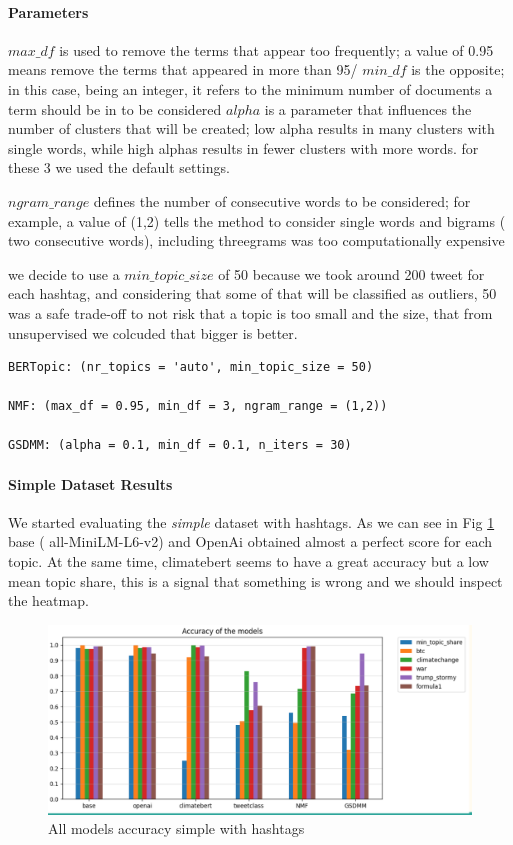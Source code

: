 \paragraph{Parameters}

$max\_df$ is used to remove the terms that appear too frequently; a value of 0.95 means remove the terms that appeared in more than 95/%
$min\_df$ is the opposite; in this case, being an integer, it refers to the minimum number of documents a term should be in to be considered 
$alpha$ is a parameter that influences the number of clusters that will be created; low alpha results in many clusters with single words, while high alphas results in fewer clusters with more words.
for these 3 we used the default settings.


$ngram\_range$ defines the number of consecutive words to be considered; for example, a value of (1,2) tells the method to consider single words and bigrams ( two consecutive words), including threegrams was too computationally expensive

we decide to use a $min\_topic\_size$ of 50 because we took around 200 tweet for each hashtag, and considering that some of that will be classified as outliers, 50 was a safe trade-off to not risk that a topic is too small and the size, that from unsupervised we colcuded that bigger is better.
\begin{verbatim}
BERTopic: (nr_topics = 'auto', min_topic_size = 50)

NMF: (max_df = 0.95, min_df = 3, ngram_range = (1,2))

GSDMM: (alpha = 0.1, min_df = 0.1, n_iters = 30)
\end{verbatim}


\paragraph{Simple Dataset Results}
We started evaluating the \textit{simple} dataset with hashtags. As we can see in Fig \ref{figure:supervised bar} base ( all-MiniLM-L6-v2) and OpenAi obtained almost a perfect score for each topic. At the same time, climatebert seems to have a great accuracy but a low mean topic share, this is a signal that something is wrong and we should inspect the heatmap.

\begin{figure}[h]
    \centering %
        \includegraphics[width=0.99\linewidth]{Chapter4/figures/topic_supervised_bar.png} 
    \caption{All models accuracy simple  with hashtags
    }
    \label{figure:supervised bar} %
\end{figure}

